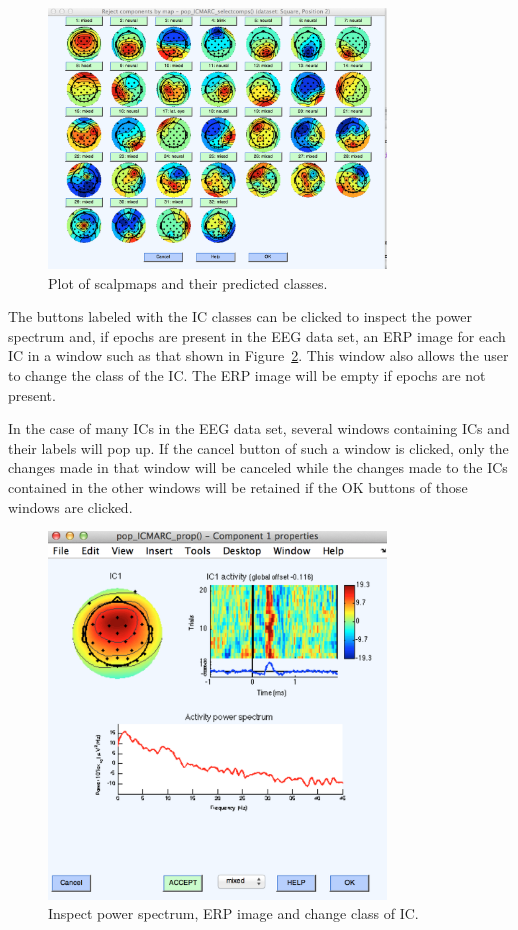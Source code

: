 \documentclass[10pt, twoside, a4paper]{article}
\begin{document}
\begin{figure}
\center
\includegraphics[width=0.8\textwidth]{figs/scalpmaps_and_classes}
\caption{Plot of scalpmaps and their predicted classes.}
\label{fig:scalpmapsAndClasses}
\end{figure}

The buttons labeled with the IC classes can be clicked to inspect the
power spectrum and, if epochs are present in the EEG data
set, an ERP image for each IC in a window such as that shown in
Figure~\ref{fig:changeClass}. This window also allows the user to
change the class of the IC. The ERP image will be empty if epochs are
not present.

In the case of many ICs in the EEG data set, several windows
containing ICs and their labels will pop up. If the cancel button of
such a window is clicked, only the changes made in that window will be
canceled while the changes made to the ICs contained in the other windows
will be retained if the OK buttons of those windows are clicked.

\begin{figure}
\center
\includegraphics[width=0.8\textwidth]{figs/changeClass}
\caption{Inspect power spectrum, ERP image and change class of IC.}
\label{fig:changeClass}
\end{figure}
\end{document}
